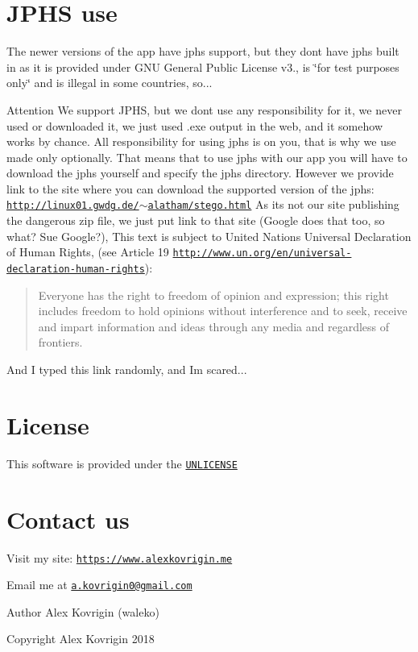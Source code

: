 \hypertarget{index_jphs-use}{}\section{J\+P\+H\+S use}\label{index_jphs-use}
The newer versions of the app have jphs support, but they don\textquotesingle{}t have jphs built in as it is provided under G\+NU General Public License v3., is \char`\"{}for test purposes only\char`\"{} and is illegal in some countries, so... \begin{DoxyAttention}{Attention}
We support J\+P\+HS, but we don\textquotesingle{}t use any responsibility for it, we never used or downloaded it, we just used .exe output in the web, and it somehow works by chance. All responsibility for using jphs is on you, that is why we use made only optionally. That means that to use jphs with our app you will have to download the jphs yourself and specify the jphs directory. However we provide link to the site where you can download the supported version of the jphs\+: \href{http://linux01.gwdg.de/~alatham/stego.html}{\tt http\+://linux01.\+gwdg.\+de/$\sim$alatham/stego.\+html} As it\textquotesingle{}s not our site publishing the dangerous zip file, we just put link to that site (Google does that too, so what? Sue Google?), This text is subject to United Nations\textquotesingle{} Universal Declaration of Human Rights, (see Article 19 \href{http://www.un.org/en/universal-declaration-human-rights}{\tt http\+://www.\+un.\+org/en/universal-\/declaration-\/human-\/rights})\+: \begin{quote}
Everyone has the right to freedom of opinion and expression; this right includes freedom to hold opinions without interference and to seek, receive and impart information and ideas through any media and regardless of frontiers. \end{quote}
And I typed this link randomly, and I\textquotesingle{}m scared...
\end{DoxyAttention}
\hypertarget{index_license}{}\section{License}\label{index_license}
This software is provided under the \href{http://unlicense.org}{\tt U\+N\+L\+I\+C\+E\+N\+SE}\hypertarget{index_contact}{}\section{Contact us}\label{index_contact}
Visit my site\+: \href{https://www.alexkovrigin.me}{\tt https\+://www.\+alexkovrigin.\+me}

Email me at \href{mailto:a.kovrigin0@gmail.com}{\tt a.\+kovrigin0@gmail.\+com}

\begin{DoxyAuthor}{Author}
Alex Kovrigin (waleko) 
\end{DoxyAuthor}
\begin{DoxyCopyright}{Copyright}
Alex Kovrigin 2018  
\end{DoxyCopyright}
